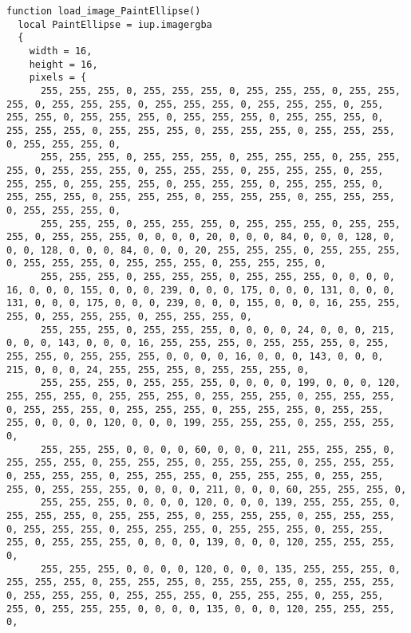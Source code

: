 \documentclass{ctexart}
\begin{document}
\begin{lstlisting}
function load_image_PaintEllipse()
  local PaintEllipse = iup.imagergba
  {
    width = 16,
    height = 16,
    pixels = {
      255, 255, 255, 0, 255, 255, 255, 0, 255, 255, 255, 0, 255, 255, 255, 0, 255, 255, 255, 0, 255, 255, 255, 0, 255, 255, 255, 0, 255, 255, 255, 0, 255, 255, 255, 0, 255, 255, 255, 0, 255, 255, 255, 0, 255, 255, 255, 0, 255, 255, 255, 0, 255, 255, 255, 0, 255, 255, 255, 0, 255, 255, 255, 0, 
      255, 255, 255, 0, 255, 255, 255, 0, 255, 255, 255, 0, 255, 255, 255, 0, 255, 255, 255, 0, 255, 255, 255, 0, 255, 255, 255, 0, 255, 255, 255, 0, 255, 255, 255, 0, 255, 255, 255, 0, 255, 255, 255, 0, 255, 255, 255, 0, 255, 255, 255, 0, 255, 255, 255, 0, 255, 255, 255, 0, 255, 255, 255, 0, 
      255, 255, 255, 0, 255, 255, 255, 0, 255, 255, 255, 0, 255, 255, 255, 0, 255, 255, 255, 0, 0, 0, 0, 20, 0, 0, 0, 84, 0, 0, 0, 128, 0, 0, 0, 128, 0, 0, 0, 84, 0, 0, 0, 20, 255, 255, 255, 0, 255, 255, 255, 0, 255, 255, 255, 0, 255, 255, 255, 0, 255, 255, 255, 0, 
      255, 255, 255, 0, 255, 255, 255, 0, 255, 255, 255, 0, 0, 0, 0, 16, 0, 0, 0, 155, 0, 0, 0, 239, 0, 0, 0, 175, 0, 0, 0, 131, 0, 0, 0, 131, 0, 0, 0, 175, 0, 0, 0, 239, 0, 0, 0, 155, 0, 0, 0, 16, 255, 255, 255, 0, 255, 255, 255, 0, 255, 255, 255, 0, 
      255, 255, 255, 0, 255, 255, 255, 0, 0, 0, 0, 24, 0, 0, 0, 215, 0, 0, 0, 143, 0, 0, 0, 16, 255, 255, 255, 0, 255, 255, 255, 0, 255, 255, 255, 0, 255, 255, 255, 0, 0, 0, 0, 16, 0, 0, 0, 143, 0, 0, 0, 215, 0, 0, 0, 24, 255, 255, 255, 0, 255, 255, 255, 0, 
      255, 255, 255, 0, 255, 255, 255, 0, 0, 0, 0, 199, 0, 0, 0, 120, 255, 255, 255, 0, 255, 255, 255, 0, 255, 255, 255, 0, 255, 255, 255, 0, 255, 255, 255, 0, 255, 255, 255, 0, 255, 255, 255, 0, 255, 255, 255, 0, 0, 0, 0, 120, 0, 0, 0, 199, 255, 255, 255, 0, 255, 255, 255, 0, 
      255, 255, 255, 0, 0, 0, 0, 60, 0, 0, 0, 211, 255, 255, 255, 0, 255, 255, 255, 0, 255, 255, 255, 0, 255, 255, 255, 0, 255, 255, 255, 0, 255, 255, 255, 0, 255, 255, 255, 0, 255, 255, 255, 0, 255, 255, 255, 0, 255, 255, 255, 0, 0, 0, 0, 211, 0, 0, 0, 60, 255, 255, 255, 0, 
      255, 255, 255, 0, 0, 0, 0, 120, 0, 0, 0, 139, 255, 255, 255, 0, 255, 255, 255, 0, 255, 255, 255, 0, 255, 255, 255, 0, 255, 255, 255, 0, 255, 255, 255, 0, 255, 255, 255, 0, 255, 255, 255, 0, 255, 255, 255, 0, 255, 255, 255, 0, 0, 0, 0, 139, 0, 0, 0, 120, 255, 255, 255, 0, 
      255, 255, 255, 0, 0, 0, 0, 120, 0, 0, 0, 135, 255, 255, 255, 0, 255, 255, 255, 0, 255, 255, 255, 0, 255, 255, 255, 0, 255, 255, 255, 0, 255, 255, 255, 0, 255, 255, 255, 0, 255, 255, 255, 0, 255, 255, 255, 0, 255, 255, 255, 0, 0, 0, 0, 135, 0, 0, 0, 120, 255, 255, 255, 0, 

\end{lstlisting}
\end{document}

